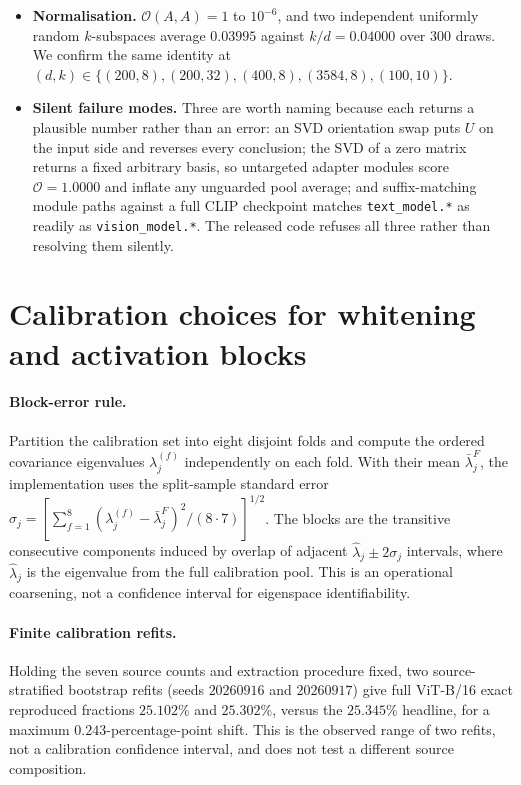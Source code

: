 \begin{itemize}
\item \textbf{Normalisation.} $\mathcal{O}(A,A)=1$ to $10^{-6}$, and two independent uniformly
random $k$-subspaces average $0.03995$ against $k/d = 0.04000$ over $300$ draws. We confirm the
same identity at $(d,k) \in \{(200,8),(200,32),(400,8),(3584,8),(100,10)\}$.
\item \textbf{Silent failure modes.} Three are worth naming because each returns a plausible
number rather than an error: an SVD orientation swap puts $U$ on the input side and reverses every
conclusion; the SVD of a zero matrix returns a fixed arbitrary basis, so untargeted adapter modules
score $\mathcal{O}=1.0000$ and inflate any unguarded pool average; and suffix-matching module paths
against a full CLIP checkpoint matches \texttt{text\_model.*} as readily as
\texttt{vision\_model.*}. The released code refuses all three rather than resolving them silently.
\end{itemize}

\section{Calibration choices for whitening and activation blocks}
\label{app:calibration}

\paragraph{Block-error rule.}
Partition the calibration set into eight disjoint folds and compute the ordered covariance
eigenvalues $\lambda_j^{(f)}$ independently on each fold. With their mean $\bar\lambda_j^{F}$,
the implementation uses the split-sample standard error
$\sigma_j=[\sum_{f=1}^{8}(\lambda_j^{(f)}-\bar\lambda_j^{F})^2/(8\cdot7)]^{1/2}$.
The blocks are the transitive consecutive components induced by overlap of adjacent
$\widehat\lambda_j\mathbin{\pm}2\sigma_j$ intervals, where $\widehat\lambda_j$ is the eigenvalue
from the full calibration pool. This is an operational coarsening, not a confidence interval for
eigenspace identifiability.

\paragraph{Finite calibration refits.}
Holding the seven source counts and extraction procedure fixed, two source-stratified bootstrap
refits (seeds $20260916$ and $20260917$) give full ViT-B/16 exact reproduced fractions
$25.102\%$ and $25.302\%$, versus the $25.345\%$ headline, for a maximum $0.243$-percentage-point
shift. This is the observed range of two refits, not a calibration confidence interval, and does
not test a different source composition.

